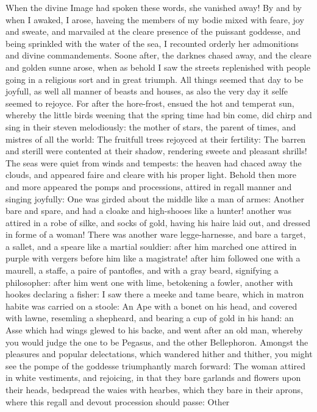 When the divine Image had spoken these words, she vanished away! By and by when
I awaked, I arose, haveing the members of my bodie mixed with feare, joy and
sweate, and marvailed at the cleare presence of the puissant goddesse, and
being sprinkled with the water of the sea, I recounted orderly her admonitions
and divine commandements. Soone after, the darknes chased away, and the cleare
and golden sunne arose, when as behold I saw the streets replenished with
people going in a religious sort and in great triumph. All things seemed that
day to be joyfull, as well all manner of beasts and houses, as also the very
day it selfe seemed to rejoyce. For after the hore-frost, ensued the hot and
temperat sun, whereby the little birds weening that the spring time had bin
come, did chirp and sing in their steven melodiously: the mother of stars, the
parent of times, and mistres of all the world: The fruitfull trees rejoyced at
their fertility: The barren and sterill were contented at their shadow,
rendering sweete and pleasant shrills! The seas were quiet from winds and
tempests: the heaven had chaced away the clouds, and appeared faire and cleare
with his proper light. Behold then more and more appeared the pomps and
processions, attired in regall manner and singing joyfully: One was girded
about the middle like a man of armes: Another bare and spare, and had a cloake
and high-shooes like a hunter! another was attired in a robe of silke, and
socks of gold, having his haire laid out, and dressed in forme of a woman!
There was another ware legge-harnesse, and bare a target, a sallet, and a
speare like a martial souldier: after him marched one attired in purple with
vergers before him like a magistrate! after him followed one with a maurell, a
staffe, a paire of pantofles, and with a gray beard, signifying a philosopher:
after him went one with lime, betokening a fowler, another with hookes
declaring a fisher: I saw there a meeke and tame beare, which in matron habite
was carried on a stoole: An Ape with a bonet on his head, and covered with
lawne, resemling a shepheard, and bearing a cup of gold in his hand: an Asse
which had wings glewed to his backe, and went after an old man, whereby you
would judge the one to be Pegasus, and the other Bellephoron. Amongst the
pleasures and popular delectations, which wandered hither and thither, you
might see the pompe of the goddesse triumphantly march forward: The woman
attired in white vestiments, and rejoicing, in that they bare garlands and
flowers upon their heads, bedspread the waies with hearbes, which they bare in
their aprons, where this regall and devout procession should passe: Other
